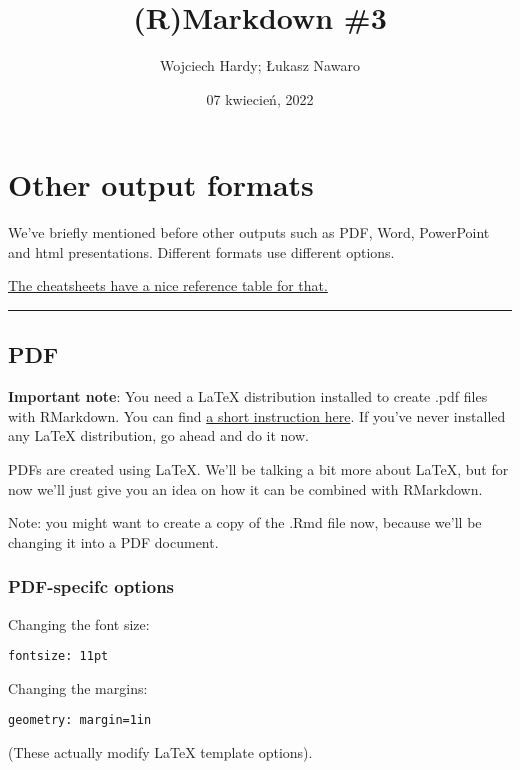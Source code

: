 \documentclass[
  11pt,
]{article}
\title{(R)Markdown \#3}
\author{Wojciech Hardy; Łukasz Nawaro}
\date{07 kwiecień, 2022}
\begin{document}
\maketitle

{
\setcounter{tocdepth}{3}
\tableofcontents
}
\hypertarget{other-output-formats}{%
\section{Other output formats}\label{other-output-formats}}

We've briefly mentioned before other outputs such as PDF, Word,
PowerPoint and html presentations. Different formats use different
options.

\href{https://www.rstudio.com/wp-content/uploads/2015/03/rmarkdown-reference.pdf}{The
cheatsheets have a nice reference table for that.}

\begin{center}\rule{0.5\linewidth}{0.5pt}\end{center}

\hypertarget{pdf}{%
\subsection{PDF}\label{pdf}}

\textbf{Important note}: You need a LaTeX distribution installed to
create .pdf files with RMarkdown. You can find
\href{https://bookdown.org/yihui/rmarkdown-cookbook/install-latex.html}{a
short instruction here}. If you've never installed any LaTeX
distribution, go ahead and do it now.

PDFs are created using LaTeX. We'll be talking a bit more about LaTeX,
but for now we'll just give you an idea on how it can be combined with
RMarkdown.

Note: you might want to create a copy of the .Rmd file now, because
we'll be changing it into a PDF document.

\hypertarget{pdf-specifc-options}{%
\subsubsection{PDF-specifc options}\label{pdf-specifc-options}}

Changing the font size:

\texttt{fontsize:\ 11pt}

Changing the margins:

\texttt{geometry:\ margin=1in}

(These actually modify LaTeX template options).
\end{document}
